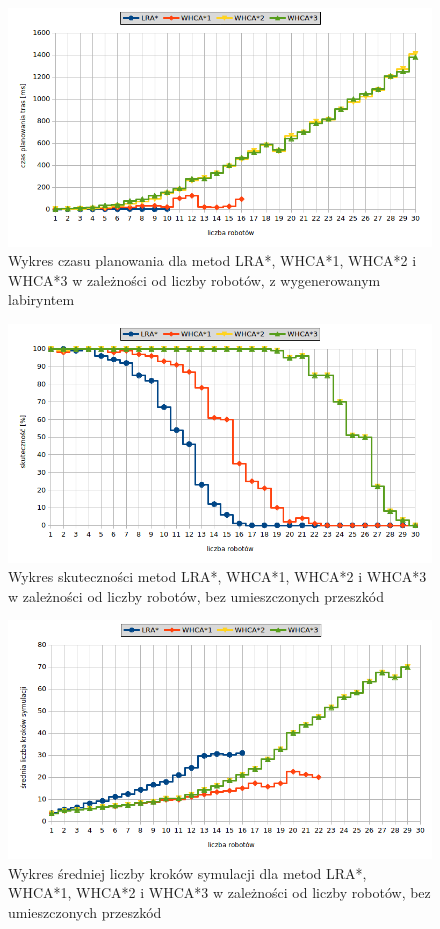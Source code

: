 \begin{figure}
	\centering
	\includegraphics[width=0.8\columnwidth]{img/plots/test-steps-maze-robots-calctime}
	\caption{Wykres czasu planowania dla metod LRA*, WHCA*1, WHCA*2 i WHCA*3 w zależności od liczby robotów, z wygenerowanym labiryntem}
	\label{fig:test-steps-maze-robots-calctime}
\end{figure}
\begin{figure}
	\centering
	\includegraphics[width=0.8\columnwidth]{img/plots/test-steps-empty-robots-eff}
	\caption{Wykres skuteczności metod LRA*, WHCA*1, WHCA*2 i WHCA*3 w zależności od liczby robotów, bez umieszczonych przeszkód}
	\label{fig:test-steps-empty-robots-eff}
\end{figure}
\begin{figure}
	\centering
	\includegraphics[width=0.8\columnwidth]{img/plots/test-steps-empty-robots-steps}
	\caption{Wykres średniej liczby kroków symulacji dla metod LRA*, WHCA*1, WHCA*2 i WHCA*3 w zależności od liczby robotów, bez umieszczonych przeszkód}
	\label{fig:test-steps-empty-robots-steps}
\end{figure}
